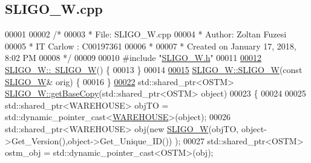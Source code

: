 \hypertarget{_s_l_i_g_o___w_8cpp_source}{}\subsection{S\+L\+I\+G\+O\+\_\+\+W.\+cpp}

\begin{DoxyCode}
00001 
00002 \textcolor{comment}{/* }
00003 \textcolor{comment}{ * File:   SLIGO\_W.cpp}
00004 \textcolor{comment}{ * Author: Zoltan Fuzesi}
00005 \textcolor{comment}{ * IT Carlow : C00197361}
00006 \textcolor{comment}{ *}
00007 \textcolor{comment}{ * Created on January 17, 2018, 8:02 PM}
00008 \textcolor{comment}{ */}
00009 
00010 \textcolor{preprocessor}{#include "\hyperlink{_s_l_i_g_o___w_8h}{SLIGO\_W.h}"}
00011 
\hypertarget{_s_l_i_g_o___w_8cpp_source.tex_l00012}{}\hyperlink{class_s_l_i_g_o___w_aa6cc833af07309dee5eb2493cddf443c}{00012} \hyperlink{class_s_l_i_g_o___w_aa6cc833af07309dee5eb2493cddf443c}{SLIGO\_W::~SLIGO\_W}() \{
00013 \}
00014 
\hypertarget{_s_l_i_g_o___w_8cpp_source.tex_l00015}{}\hyperlink{class_s_l_i_g_o___w_abd92acb0451fe449fbdb7c3c2a6701b7}{00015} \hyperlink{class_s_l_i_g_o___w_a9b669809dc7cf8d9982181ac7997b0da}{SLIGO\_W::SLIGO\_W}(\textcolor{keyword}{const} \hyperlink{class_s_l_i_g_o___w}{SLIGO\_W}& orig) \{
00016 \}
\hypertarget{_s_l_i_g_o___w_8cpp_source.tex_l00022}{}\hyperlink{class_s_l_i_g_o___w_a37ead49afd27bfe7e404d1d7626f09fe}{00022} std::shared\_ptr<OSTM> \hyperlink{class_s_l_i_g_o___w_a37ead49afd27bfe7e404d1d7626f09fe}{SLIGO\_W::getBaseCopy}(std::shared\_ptr<OSTM> \textcolor{keywordtype}{object})
00023 \{
00024 
00025     std::shared\_ptr<WAREHOUSE> objTO = std::dynamic\_pointer\_cast<\hyperlink{class_w_a_r_e_h_o_u_s_e}{WAREHOUSE}>(object);
00026     std::shared\_ptr<WAREHOUSE> obj(\textcolor{keyword}{new} \hyperlink{class_s_l_i_g_o___w_a9b669809dc7cf8d9982181ac7997b0da}{SLIGO\_W}(objTO, object->Get\_Version(),\textcolor{keywordtype}{object}->Get\_Unique\_ID())
      );
00027     std::shared\_ptr<OSTM> ostm\_obj = std::dynamic\_pointer\_cast<OSTM>(obj);                                 
       

\end{DoxyCode}
